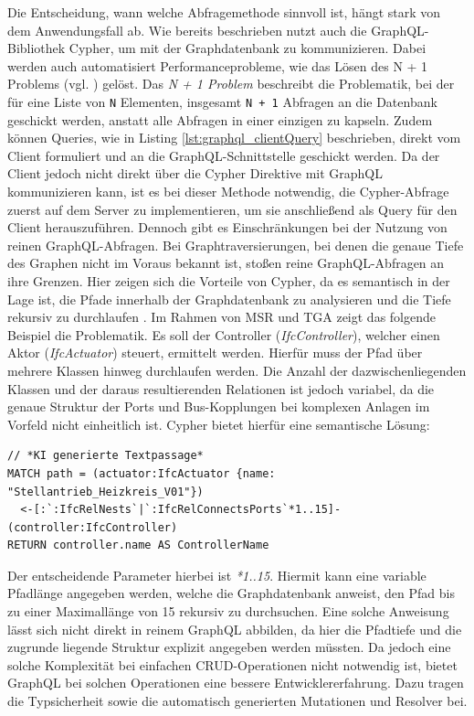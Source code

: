 Die Entscheidung, wann welche Abfragemethode sinnvoll ist, hängt stark von dem Anwendungsfall ab. Wie bereits beschrieben nutzt auch die GraphQL-Bibliothek Cypher, um mit der Graphdatenbank zu kommunizieren. Dabei werden auch automatisiert Performanceprobleme, wie das Lösen des N + 1 Problems (vgl. \cite{neo4j_graphql_node}) gelöst. Das \textsl{N + 1 Problem} beschreibt die Problematik, bei der für eine Liste von \texttt{N} Elementen, insgesamt \texttt{N + 1} Abfragen an die Datenbank geschickt werden, anstatt alle Abfragen in einer einzigen zu kapseln. Zudem können Queries, wie in Listing \ref{lst:graphql_clientQuery} beschrieben, direkt vom Client formuliert und an die GraphQL-Schnittstelle geschickt werden. Da der Client jedoch nicht direkt über die Cypher Direktive mit GraphQL kommunizieren kann, ist es bei dieser Methode notwendig, die Cypher-Abfrage zuerst auf dem Server zu implementieren, um sie anschließend als Query für den Client herauszuführen. \newline
Dennoch gibt es Einschränkungen bei der Nutzung von reinen GraphQL-Abfragen. Bei Graphtraversierungen, bei denen die genaue Tiefe des Graphen nicht im Voraus bekannt ist, stoßen reine GraphQL-Abfragen an ihre Grenzen. Hier zeigen sich die Vorteile von Cypher, da es semantisch in der Lage ist, die Pfade innerhalb der Graphdatenbank zu analysieren und die Tiefe rekursiv zu durchlaufen \cite{neo4j_cypher_variable_length}.
Im Rahmen von MSR und TGA zeigt das folgende Beispiel die Problematik. Es soll der Controller (\textit{IfcController}), welcher einen Aktor (\textit{IfcActuator}) steuert, ermittelt werden. Hierfür muss der Pfad über mehrere Klassen hinweg durchlaufen werden. Die Anzahl der dazwischenliegenden Klassen und der daraus resultierenden Relationen ist jedoch variabel, da die genaue Struktur der Ports und Bus-Kopplungen bei komplexen Anlagen im Vorfeld nicht einheitlich ist. Cypher bietet hierfür eine semantische Lösung:
\begin{lstlisting}[caption={Serverseitige Abfrage für die Klasse \textit{IfcSensor}}, label={lst:graphql_recurive_query}]
// *KI generierte Textpassage*
MATCH path = (actuator:IfcActuator {name: "Stellantrieb_Heizkreis_V01"})
  <-[:`:IfcRelNests`|`:IfcRelConnectsPorts`*1..15]- (controller:IfcController)
RETURN controller.name AS ControllerName
\end{lstlisting}
Der entscheidende Parameter hierbei ist \textit{*1..15}. Hiermit kann eine variable Pfadlänge angegeben werden, welche die Graphdatenbank anweist, den Pfad bis zu einer Maximallänge von 15 rekursiv zu durchsuchen.
Eine solche Anweisung lässt sich nicht direkt in reinem GraphQL abbilden, da hier die Pfadtiefe und die zugrunde liegende Struktur explizit angegeben werden müssten.
Da jedoch eine solche Komplexität bei einfachen CRUD-Operationen nicht notwendig ist, bietet GraphQL bei solchen Operationen eine bessere Entwicklererfahrung. Dazu tragen die Typsicherheit sowie die automatisch generierten Mutationen und Resolver bei.

